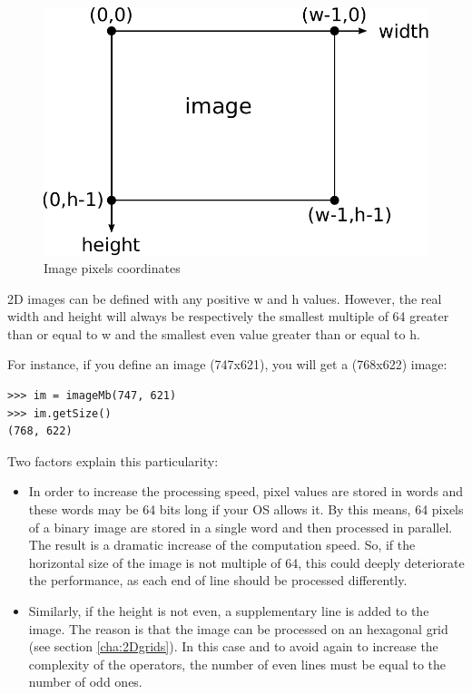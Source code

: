 \documentclass[a4paper,10pt,oneside]{article}
\begin{document}
\begin{figure}
\centering
\includegraphics[scale=0.7]{figures/image_coord.pdf}
\caption{Image pixels coordinates}
\label{fig:image_coord}
\end{figure}

2D images can be defined with any positive w and h values. However, the real width and height will
always be respectively the smallest multiple of 64 greater than or equal to w and the smallest even
value greater than or equal to h. 

For instance, if you define an image (747x621), you will get a (768x622) image:

\lstset{language=Python}
\begin{lstlisting}
>>> im = imageMb(747, 621)
>>> im.getSize()
(768, 622) 
\end{lstlisting}

Two factors explain this particularity:

\begin{itemize}
\item In order to increase the processing speed, pixel values are stored in words and these
words may be 64 bits long if your OS allows it. By this means, 64 pixels of a binary image
are stored in a single word and then processed in parallel. The result is a dramatic increase
of the computation speed. So, if the horizontal size of the image is not multiple of 64, this could
deeply deteriorate the performance, as each end of line should be processed differently. 
\item Similarly, if the height is not even, a supplementary line is added to the image. The
reason is that the image can be processed on an hexagonal grid (see section \ref{cha:2Dgrids}). In this case and to
avoid again to increase the complexity of the operators, the number of even lines must be equal to
the number of odd ones.
\end{itemize}
\end{document}
